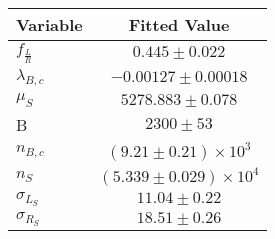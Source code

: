 \begin{tabular}[t]{lc}
\hline
Variable &Fitted Value\\
\hline\hline
$f_{\frac{L}{R}}$&$0.445\pm0.022$\\
\hline
$\lambda_{B,c}$&$-0.00127\pm0.00018$\\
\hline
$\mu_S$&$5278.883\pm0.078$\\
\hline
B&$2300\pm53$\\
\hline
$n_{B,c}$&$(9.21\pm0.21)\times 10^3$\\
\hline
$n_S$&$(5.339\pm0.029)\times 10^4$\\
\hline
$\sigma_{L_S}$&$11.04\pm0.22$\\
\hline
$\sigma_{R_S}$&$18.51\pm0.26$\\
\hline
\end{tabular}